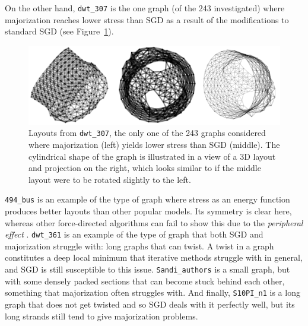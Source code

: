 On the other hand, \texttt{dwt\_307} is the one graph (of the 243 investigated) where majorization reaches lower stress than SGD as a result of the modifications to standard SGD (see Figure~\ref{fig:cylinder}).

\begin{figure}
  \centering
  \includegraphics[width=1\textwidth]{stress/dwt_307.png}
  \caption[The one graph in the test set where majorization performs better]{Layouts from \texttt{dwt\_307}, the only one of the 243 graphs considered where majorization (left) yields lower stress than SGD (middle). The cylindrical shape of the graph is illustrated in a view of a 3D layout and projection on the right, which looks similar to if the middle layout were to be rotated slightly to the left.
  }
  \label{fig:cylinder}
\end{figure}

\texttt{494\_bus} is an example of the type of graph where stress as an energy function produces better layouts than other popular models. Its symmetry is clear here, whereas other force-directed algorithms can fail to show this due to the \emph{peripheral effect} \citep{Hu2005}.
\texttt{dwt\_361} is an example of the type of graph that both SGD and majorization struggle with: long graphs that can twist. A twist in a graph constitutes a deep local minimum that iterative methods struggle with in general, and SGD is still susceptible to this issue.
\texttt{Sandi\_authors} is a small graph, but with some densely packed sections that can become stuck behind each other, something that majorization often struggles with.
And finally, \texttt{S10PI\_n1} is a long graph that does not get twisted and so SGD deals with it perfectly well, but its long strands still tend to give majorization problems.

